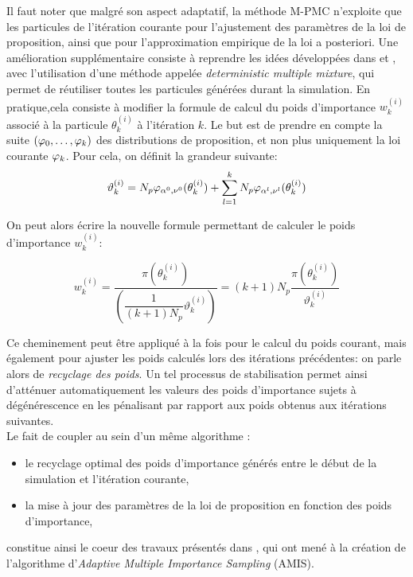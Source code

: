 {Il faut noter que malgré son aspect adaptatif, la méthode M-PMC n'exploite que les particules de l'itération courante pour l'ajustement des paramètres de la loi de proposition, ainsi que pour l'approximation empirique de la loi a posteriori. Une amélioration supplémentaire consiste à reprendre les idées développées dans } \cite{Veach1995} et \cite{Owen2000}, avec l'utilisation d'une méthode appelée \textit{deterministic multiple mixture}, {qui permet de réutiliser toutes les particules générées durant la simulation}. En pratique,cela consiste à modifier la formule de calcul du poids d'importance $w_k^{(i)}$ associé à la particule $\theta_k^{(i)}$ à l'itération $k$. Le but est de prendre en compte la suite $({\varphi}_0, \dots, {\varphi}_k)$ des distributions de proposition, et non plus uniquement la loi  courante ${\varphi}_k$. Pour cela, on définit la grandeur suivante:
\begin{equation}
\vartheta_k^{(i)} = N_p {\varphi}_{\alpha^0,\nu^0}(\theta_k^{(i)}) + \sum\limits_{l=1}^k N_p {\varphi}_{\alpha^l,\nu^l}(\theta_k^{(i)})
\label{eq_DMW_1}
\end{equation}

On peut alors écrire la nouvelle formule permettant de calculer le poids d'importance $w_k^{(i)}$:

\begin{equation}
w_k^{(i)} = \dfrac{\pi(\theta_k^{(i)})}{\left(\dfrac{1}{(k+1)N_p}\vartheta_k^{(i)}\right)} = (k+1)N_p\dfrac{\pi(\theta_k^{(i)})}{\vartheta_k^{(i)}}
\end{equation}

Ce cheminement peut être appliqué à la fois pour le calcul du poids courant, mais également pour ajuster les poids calculés lors des itérations précédentes: on parle alors de \textit{recyclage des poids}. Un tel processus de stabilisation  permet ainsi d'atténuer automatiquement les valeurs des poids d'importance sujets à dégénérescence en les pénalisant par rapport aux poids obtenus aux itérations suivantes.\\

Le fait de coupler au sein d'un même algorithme : \\

\begin{itemize}
	\item le  recyclage optimal des poids d'importance générés entre le début de la simulation et l'itération courante,
	\item la mise à jour des paramètres de la loi de proposition en fonction des poids d'importance,\\
\end{itemize}
constitue ainsi le coeur des travaux présentés dans \cite{Cornuet2012}, qui ont mené à la création de l'algorithme d'\textit{Adaptive Multiple Importance Sampling} (AMIS). \\


